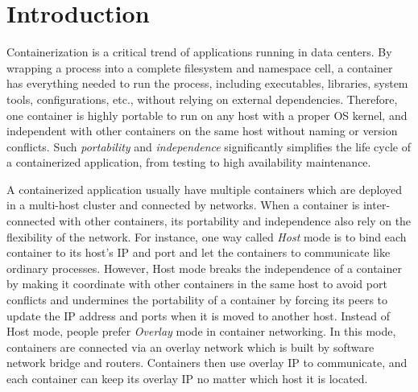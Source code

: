 \section{Introduction} \label{sec:introduction}


Containerization is a critical trend of applications running in data centers.
By wrapping a process into a complete filesystem and namespace cell, a container
has everything needed to run the process, including executables, libraries, system
tools, configurations, etc., without relying on external dependencies.
Therefore, one container
is highly portable to run on any host with a proper OS kernel, and independent
with other containers on the same host without naming or version conflicts.
Such {\em portability} and {\em independence} significantly simplifies 
the life cycle of
a containerized application, from testing to high availability maintenance.

A containerized application usually have multiple containers which are 
deployed in a multi-host cluster and connected by networks. When a container
is inter-connected with other containers, its portability and independence 
also rely on the flexibility of the network. For instance, one way called 
{\em Host} mode  is to bind each container to its host's IP
and port and let the containers to communicate like ordinary processes.
However, Host mode breaks the independence of a container by making it
coordinate with other containers in the same host to avoid port conflicts
and undermines the portability of a container by forcing its peers to
update the IP address and ports when it is moved to another host.
Instead of Host mode, people prefer {\em Overlay} mode in container networking.
In this mode, containers are connected via an overlay network which 
is built by software network bridge and routers. Containers then use
overlay IP to communicate, and each container can keep its overlay IP
no matter which host it is located.  

